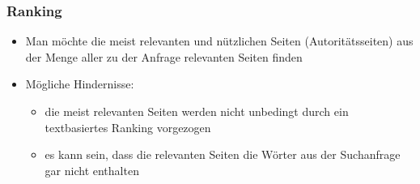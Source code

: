 \documentclass[hyperref={pdfpagelabels=false}]{beamer}
\begin{document}
\begin{frame}
\frametitle{Ranking}

\begin{itemize}
\item Man möchte die meist relevanten und nützlichen Seiten (Autoritätsseiten) aus der Menge aller zu der Anfrage relevanten Seiten finden
\item Mögliche Hindernisse:
	\begin{itemize}
	\item die meist relevanten Seiten werden nicht unbedingt durch ein textbasiertes Ranking vorgezogen
	\item es kann sein,  dass die relevanten Seiten die Wörter aus der Suchanfrage gar nicht enthalten
	\end{itemize}
\end{itemize}
\end{frame}
\end{document}
